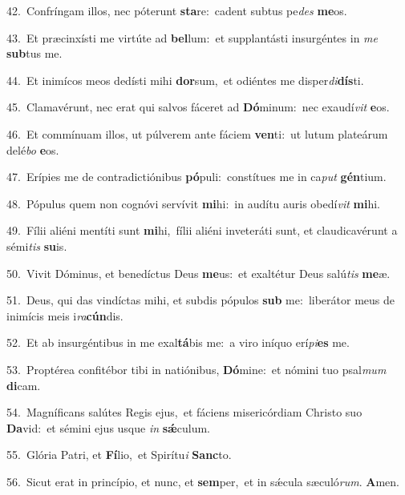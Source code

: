 {\numbfont\textcolor{\numbcolor}{42.}}~Confríngam illos, nec póterunt \textbf{sta}\-re:~\star cadent subtus pe\textit{des} \textbf{me}\-os.\par
{\numbfont\textcolor{\numbcolor}{43.}}~Et præcinxísti me virtúte ad \textbf{bel}\-lum:~\star et supplantásti insurgéntes in \textit{me} \textbf{sub}\-tus me.\par
{\numbfont\textcolor{\numbcolor}{44.}}~Et inimícos meos dedísti mihi \textbf{dor}\-sum,~\star et odiéntes me disper\-\textit{di}\-\textbf{dís}ti.\par
{\numbfont\textcolor{\numbcolor}{45.}}~Clamavérunt, nec erat qui salvos fáceret ad \textbf{Dó}\-minum:~\star nec exaudí\textit{vit} \textbf{e}\-os.\par
{\numbfont\textcolor{\numbcolor}{46.}}~Et commínuam illos, ut púlverem ante fáciem \textbf{ven}\-ti:~\star ut lutum plateárum delé\textit{bo} \textbf{e}\-os.\par
{\numbfont\textcolor{\numbcolor}{47.}}~Erípies me de contradictiónibus \textbf{pó}\-puli:~\star constítues me in ca\textit{put} \textbf{gén}\-tium.\par
{\numbfont\textcolor{\numbcolor}{48.}}~Pópulus quem non cognóvi servívit \textbf{mi}\-hi:~\star in audítu auris obedí\textit{vit} \textbf{mi}\-hi.\par
{\numbfont\textcolor{\numbcolor}{49.}}~Fílii aliéni mentíti sunt \textbf{mi}\-hi,~\star fílii aliéni inveteráti sunt, et claudicavérunt a sémi\textit{tis} \textbf{su}\-is.\par
{\numbfont\textcolor{\numbcolor}{50.}}~Vivit Dóminus, et benedíctus Deus \textbf{me}\-us:~\star et exaltétur Deus salú\textit{tis} \textbf{me}\-æ.\par
{\numbfont\textcolor{\numbcolor}{51.}}~Deus, qui das vindíctas mihi, et subdis pópulos \textbf{sub} me:~\star liberátor meus de inimícis meis i\-\textit{ra}\-\textbf{cún}dis.\par
{\numbfont\textcolor{\numbcolor}{52.}}~Et ab insurgéntibus in me exal\-\textbf{tá}\-bis me:~\star a viro iníquo erí\-\textit{pi}\-\textbf{es} me.\par
{\numbfont\textcolor{\numbcolor}{53.}}~Proptérea confitébor tibi in natiónibus, \textbf{Dó}\-mine:~\star et nómini tuo psal\textit{mum} \textbf{di}\-cam.\par
{\numbfont\textcolor{\numbcolor}{54.}}~Magníficans salútes Regis ejus,~\dagger et fáciens misericórdiam Christo suo \textbf{Da}\-vid:~\star et sémini ejus usque \textit{in} \textbf{sǽ}\-culum.\par
{\numbfont\textcolor{\numbcolor}{55.}}~Glória Patri, et \textbf{Fí}\-lio,~\star et Spirítu\textit{i} \textbf{Sanc}\-to.\par
{\numbfont\textcolor{\numbcolor}{56.}}~Sicut erat in princípio, et nunc, et \textbf{sem}\-per,~\star et in sǽcula sæculó\-\textit{rum}\-. \textbf{A}\-men.\par
